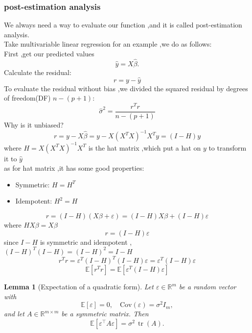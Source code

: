 \documentclass[a4paper, 12pt]{article}
\newtheorem{lemma}{Lemma}
\begin{document}
\subsubsection{post-estimation analysis}
We always need a way to evaluate our function ,and it is called post-estimation analysis.\\
Take multivariable linear regression for an example ,we do as follows:\\
First ,get our predicted values
$$\hat y=X\hat \beta .$$
Calculate the residual:
$$r=y- \hat y$$
To evaluate the residual without bias ,we divided the squared residual by degrees of freedom(DF) $n-(p+1)$:
$$\hat \sigma^2 = \frac{r^Tr}{n-(p+1)}$$
Why is it unbiased?
$$r=y-X\hat \beta= y- X(X^TX)^{-1}X^Ty =(I-H)y$$
where $H=X(X^TX)^{-1}X^T$ is the hat matrix ,which put a hat on $y$ to transform it to $\hat y$\\
as for hat matrix ,it has some good properties:\begin{itemize}
  \item Symmetric: $H=H^T$
  \item Idempotent: $H^2=H$ 
\end{itemize}
$$r= (I-H)(X\beta+\varepsilon)=(I-H)X\beta +(I-H)\varepsilon $$
where $HX\beta = X\beta$
$$r = (I-H)\varepsilon$$
since $I-H$ is symmetric and idempotent ,$(I-H)^T(I-H) = (I-H)^2 =I-H$
$$r^Tr =\varepsilon^T(I-H)^T(I-H)\varepsilon =\varepsilon^T(I-H)\varepsilon $$
$$\mathbb{E}[r^Tr] = \mathbb{E}[\varepsilon^T (I-H)\varepsilon]$$
\begin{lemma}[Expectation of a quadratic form]
Let $\varepsilon \in \mathbb{R}^m$ be a random vector with
\[
\mathbb{E}[\varepsilon] = 0, \quad \text{Cov}(\varepsilon) = \sigma^2 I_m,
\]
and let $A \in \mathbb{R}^{m \times m}$ be a symmetric matrix. Then
\[
\mathbb{E}[\varepsilon^\top A \varepsilon] = \sigma^2 \, \operatorname{tr}(A).
\]
\end{lemma}
\end{document}
